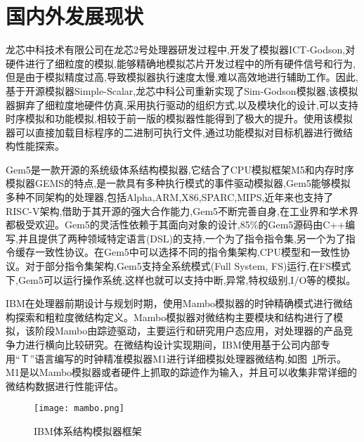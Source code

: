 \section{国内外发展现状}
龙芯中科技术有限公司\cite{zhang2007sim,gao2007simos}在龙芯2号处理器研发过程中,开发了模拟器ICT-Godson,对硬件进行了细粒度的模拟,能够精确地模拟芯片开发过程中的所有硬件信号和行为,但是由于模拟精度过高,导致模拟器执行速度太慢,难以高效地进行辅助工作。因此,基于开源模拟器Simple-Scalar\cite{austin2002simplescalar},龙芯中科公司重新实现了Sim-Godson模拟器\cite{zhang2007sim},该模拟器摒弃了细粒度地硬件仿真,采用执行驱动的组织方式,以及模块化的设计,可以支持时序模拟和功能模拟\cite{zhang2007sim},相较于前一版的模拟器性能得到了极大的提升。使用该模拟器可以直接加载目标程序的二进制可执行文件,通过功能模拟对目标机器进行微结构性能探索\cite{desikan2001sim}。

Gem5是一款开源的系统级体系结构模拟器,它结合了CPU模拟框架M5和内存时序模拟器GEMS的特点,是一款具有多种执行模式的事件驱动模拟器\cite{许鹏2006一种应用于嵌入式系统中断控制},Gem5能够模拟多种不同架构的处理器,包括Alpha,ARM,X86,SPARC,MIPS,近年来也支持了RISC-V架构,借助于其开源的强大合作能力,Gem5不断完善自身,在工业界和学术界都极受欢迎。Gem5的灵活性依赖于其面向对象的设计,85\%的Gem5源码由C++编写,并且提供了两种领域特定语言(DSL)的支持,一个为了指令指令集,另一个为了指令缓存一致性协议。在Gem5中可以选择不同的指令集架构,CPU模型和一致性协议。对于部分指令集架构,Gem5支持全系统模式(Full System, FS)运行,在FS模式下,Gem5可以运行操作系统,这样也就可以支持中断,异常,特权级别,I/O等的模拟。


IBM在处理器前期设计与规划时期，使用Mambo\cite{boh}模拟器的时钟精确模式进行微结构探索和粗粒度微结构定义。Mambo模拟器对微结构主要模块和结构进行了模拟，该阶段Mambo由踪迹驱动，主要运行和研究用户态应用，对处理器的产品竞争力进行横向比较研究\cite{kistlerexperiences}。在微结构设计实现期间，IBM使用基于公司内部专用“Ｔ”语言\cite{asaad2012cycle,chaix2019implementation}编写的时钟精准模拟器M1进行详细模拟处理器微结构\cite{kistlerexperiences},如图~\ref{fig:IBM}所示。M1是以Mambo模拟器或者硬件上抓取的踪迹作为输入，并且可以收集非常详细的微结构数据进行性能评估\cite{magnusson2002simics}。
\begin{figure}[h]
  \centering
  \texttt{[image: mambo.png]}
  \caption{IBM体系结构模拟器框架}
  \label{fig:IBM}
\end{figure}  


